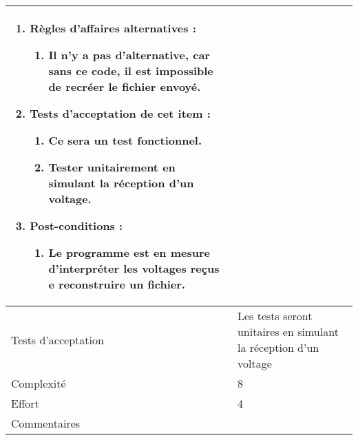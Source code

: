 \begin{longtable}{|l|p{}|}
\begin{enumerate}[label*=\arabic*.]
\begin{enumerate}[label*=\arabic*.]
                                \item Règles d'affaires alternatives :
                                \begin{enumerate}[label*=\arabic*.]
                                    \item Il n'y a pas d'alternative, car sans ce code, il est impossible de recréer le fichier envoyé.
                                \end{enumerate}
                                \item Tests d'acceptation de cet item :
                                \begin{enumerate}[label*=\arabic*.]
                                    \item Ce sera un test fonctionnel.
                                    \item Tester unitairement en simulant la réception d'un voltage. 
                                \end{enumerate}
                                \item Post-conditions :
                                \begin{enumerate}[label*=\arabic*.]
                                    \item Le programme est en mesure d'interpréter les voltages reçus e reconstruire un fichier.
                                \end{enumerate}
                            \end{enumerate}
                               \end{enumerate} \\

\hline
    Tests d'acceptation & Les tests seront unitaires en simulant la réception d'un voltage \\
\hline
    Complexité & 8 \\
\hline
    Effort & 4 \\
\hline
    Commentaires & \\
\hline
\end{longtable}
